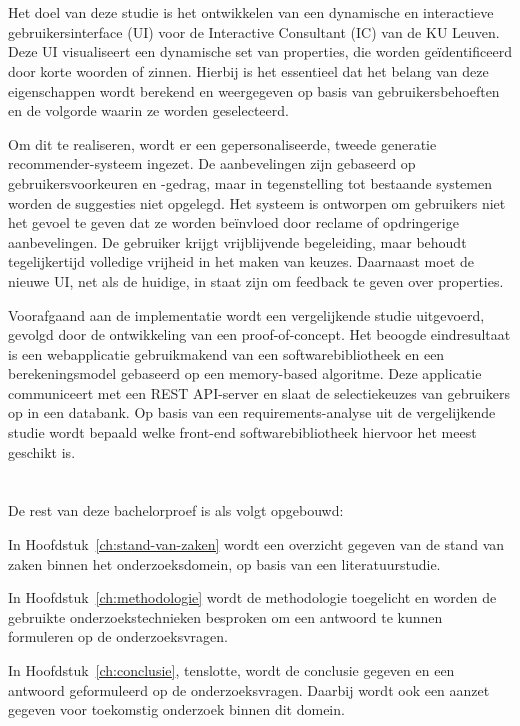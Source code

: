 \section{}%
\label{sec:onderzoeksdoelstelling}
Het doel van deze studie is het ontwikkelen van een dynamische en interactieve gebruikersinterface (UI) voor de Interactive Consultant (IC) van de KU Leuven. Deze UI visualiseert een dynamische set van properties, die worden geïdentificeerd door korte woorden of zinnen. Hierbij is het essentieel dat het belang van deze eigenschappen wordt berekend en weergegeven op basis van gebruikersbehoeften en de volgorde waarin ze worden geselecteerd.\smallskip\par Om dit te realiseren, wordt er een gepersonaliseerde, tweede generatie recomm\-ender-systeem ingezet. De aanbevelingen zijn gebaseerd op gebruikersvoorkeuren en -gedrag, maar in tegenstelling tot bestaande systemen worden de suggesties niet opgelegd. Het systeem is ontworpen om gebruikers niet het gevoel te geven dat ze worden beïnvloed door reclame of opdringerige aanbevelingen. De gebruiker krijgt vrijblijvende begeleiding, maar behoudt tegelijkertijd volledige vrijheid in het maken van keuzes. Daarnaast moet de nieuwe UI, net als de huidige, in staat zijn om feedback te geven over properties.\smallskip\par  Voorafgaand aan de implementatie wordt een vergelijkende studie uitgevoerd, gevolgd door de ontwikkeling van een proof-of-concept. Het beoogde eindresultaat is een webapplicatie gebruikmakend van een softwarebibliotheek en een berekeningsmodel gebaseerd op een memory-based algoritme. Deze applicatie communiceert met een REST API-server en slaat de selectiekeuzes van gebruikers op in een databank. Op basis van een requirements-analyse uit de vergelijkende studie wordt bepaald welke front-end softwarebibliotheek hiervoor het meest geschikt is.

\section{}%
\label{sec:opzet-bachelorproef}

De rest van deze bachelorproef is als volgt opgebouwd:

In Hoofdstuk~\ref{ch:stand-van-zaken} wordt een overzicht gegeven van de stand van zaken binnen het onderzoeksdomein, op basis van een literatuurstudie.

In Hoofdstuk~\ref{ch:methodologie} wordt de methodologie toegelicht en worden de gebruikte onderzoekstechnieken besproken om een antwoord te kunnen formuleren op de onderzoeksvragen.

In Hoofdstuk~\ref{ch:conclusie}, tenslotte, wordt de conclusie gegeven en een antwoord geformuleerd op de onderzoeksvragen. Daarbij wordt ook een aanzet gegeven voor toekomstig onderzoek binnen dit domein.